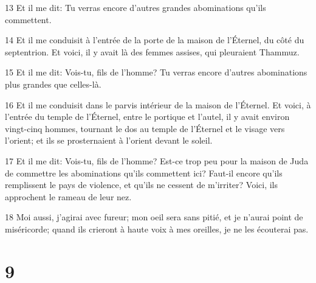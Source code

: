 \par 13 Et il me dit: Tu verras encore d'autres grandes abominations qu'ils commettent.
\par 14 Et il me conduisit à l'entrée de la porte de la maison de l'Éternel, du côté du septentrion. Et voici, il y avait là des femmes assises, qui pleuraient Thammuz.
\par 15 Et il me dit: Vois-tu, fils de l'homme? Tu verras encore d'autres abominations plus grandes que celles-là.
\par 16 Et il me conduisit dans le parvis intérieur de la maison de l'Éternel. Et voici, à l'entrée du temple de l'Éternel, entre le portique et l'autel, il y avait environ vingt-cinq hommes, tournant le dos au temple de l'Éternel et le visage vers l'orient; et ils se prosternaient à l'orient devant le soleil.
\par 17 Et il me dit: Vois-tu, fils de l'homme? Est-ce trop peu pour la maison de Juda de commettre les abominations qu'ils commettent ici? Faut-il encore qu'ils remplissent le pays de violence, et qu'ils ne cessent de m'irriter? Voici, ils approchent le rameau de leur nez.
\par 18 Moi aussi, j'agirai avec fureur; mon oeil sera sans pitié, et je n'aurai point de miséricorde; quand ils crieront à haute voix à mes oreilles, je ne les écouterai pas.

\chapter{9}

